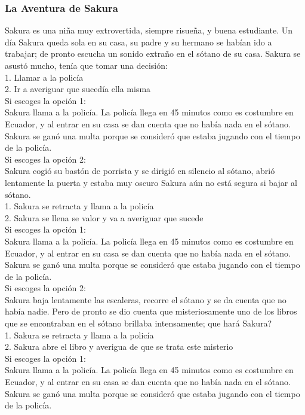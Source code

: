 \documentclass[12pt]{article}
\begin{document}
{{{\begin{flushleft}
\subsubsection{La Aventura de Sakura}
\vspace{0.1in}
Sakura es una niña muy extrovertida, siempre risueña, y buena estudiante.
Un día Sakura queda sola en su casa, su padre y su hermano se habían ido a trabajar; de pronto escucha un sonido extraño en el sótano de su casa. Sakura se asustó mucho, tenía que tomar una decisión: \\
1.	Llamar a la policía\\
2.	Ir a averiguar que sucedía ella misma\\
Si escoges la opción 1:\\
Sakura llama a la policía. La policía llega en 45 minutos como es costumbre en Ecuador, y al entrar en su casa se dan cuenta que no había nada en el sótano. Sakura se ganó una multa porque se consideró que estaba jugando con el tiempo de la policía.\\
Si escoges la opción 2:\\
Sakura cogió su bastón de porrista y se dirigió en silencio al sótano, abrió lentamente la puerta y estaba muy oscuro
Sakura aún no está segura si bajar al sótano.\\
1.	Sakura se retracta y llama a la policía\\
2.	Sakura se llena se valor y va a averiguar que sucede\\
Si escoges la opción 1:\\
Sakura llama a la policía. La policía llega en 45 minutos como es costumbre en Ecuador, y al entrar en su casa se dan cuenta que no había nada en el sótano. Sakura se ganó una multa porque se consideró que estaba jugando con el tiempo de la policía.\\
Si escoges la opción 2:\\
Sakura baja lentamente las escaleras, recorre el sótano y se da cuenta que no había nadie. Pero de pronto se dio cuenta que misteriosamente uno de los libros que se encontraban en el sótano brillaba intensamente; que hará Sakura?\\
1.	Sakura se retracta y llama a la policía\\
2.	Sakura abre el libro y averigua de que se trata este misterio\\

Si escoges la opción 1:\\
Sakura llama a la policía. La policía llega en 45 minutos como es costumbre en Ecuador, y al entrar en su casa se dan cuenta que no había nada en el sótano. Sakura se ganó una multa porque se consideró que estaba jugando con el tiempo de la policía.\\


\end{flushleft}}}}
\end{document}
